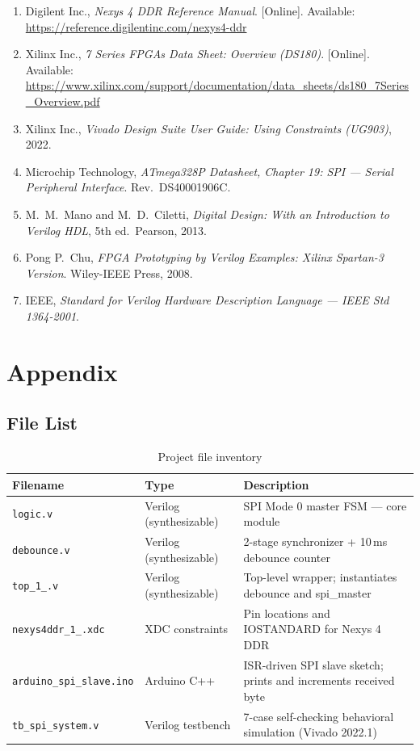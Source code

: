 \documentclass[12pt,a4paper]{report}
\begin{document}
\begin{enumerate}[leftmargin=1.5em]
  \item Digilent Inc., \textit{Nexys 4 DDR Reference Manual}. [Online]. Available: \url{https://reference.digilentinc.com/nexys4-ddr}
  \item Xilinx Inc., \textit{7 Series FPGAs Data Sheet: Overview (DS180)}. [Online]. Available: \url{https://www.xilinx.com/support/documentation/data_sheets/ds180_7Series_Overview.pdf}
  \item Xilinx Inc., \textit{Vivado Design Suite User Guide: Using Constraints (UG903)}, 2022.
  \item Microchip Technology, \textit{ATmega328P Datasheet, Chapter 19: SPI --- Serial Peripheral Interface}. Rev.\ DS40001906C.
  \item M.~M.~Mano and M.~D.~Ciletti, \textit{Digital Design: With an Introduction to Verilog HDL}, 5th ed.\ Pearson, 2013.
  \item Pong P.~Chu, \textit{FPGA Prototyping by Verilog Examples: Xilinx Spartan-3 Version}. Wiley-IEEE Press, 2008.
  \item IEEE, \textit{Standard for Verilog Hardware Description Language --- IEEE Std 1364-2001}.
\end{enumerate}

\chapter{Appendix}

\section{File List}

\begin{table}[H]
  \centering
  \caption{Project file inventory}
  \label{tab:filelist}
  \begin{tabularx}{\linewidth}{llX}
    \toprule
    \textbf{Filename} & \textbf{Type} & \textbf{Description} \\
    \midrule
    \texttt{logic.v}             & Verilog (synthesizable) & SPI Mode 0 master FSM --- core module \\
    \texttt{debounce.v}          & Verilog (synthesizable) & 2-stage synchronizer + 10\,ms debounce counter \\
    \texttt{top\_1\_.v}          & Verilog (synthesizable) & Top-level wrapper; instantiates debounce and spi\_master \\
    \texttt{nexys4ddr\_1\_.xdc}  & XDC constraints         & Pin locations and IOSTANDARD for Nexys 4 DDR \\
    \texttt{arduino\_spi\_slave.ino} & Arduino C++         & ISR-driven SPI slave sketch; prints and increments received byte \\
    \texttt{tb\_spi\_system.v}   & Verilog testbench       & 7-case self-checking behavioral simulation (Vivado 2022.1) \\
    \bottomrule
  \end{tabularx}
\end{table}
\end{document}
